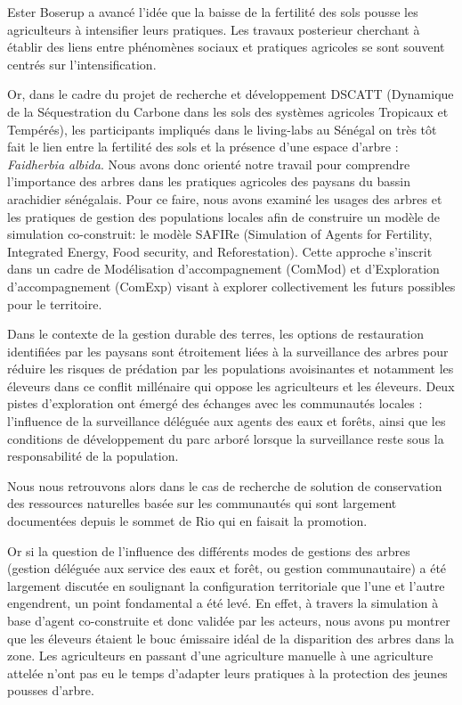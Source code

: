 \documentclass{article}
\begin{document}
Ester Boserup \parencite{boserup_conditions_1965} a avancé l'idée que la baisse de la fertilité des sols pousse les agriculteurs à intensifier leurs pratiques. Les travaux posterieur cherchant à établir des liens entre phénomènes sociaux et pratiques agricoles se sont souvent centrés sur l'intensification. 

Or, dans le cadre du projet de recherche et développement DSCATT (Dynamique de la Séquestration du Carbone dans les sols des systèmes agricoles Tropicaux et Tempérés), les participants impliqués dans le living-labs au Sénégal on très tôt fait le lien entre la fertilité des sols et la présence d'une espace d'arbre : \textit{Faidherbia albida}. Nous avons donc orienté notre travail pour comprendre l'importance des arbres dans les pratiques agricoles des paysans du bassin arachidier sénégalais. Pour ce faire, nous avons examiné les usages des arbres et les pratiques de gestion des populations locales afin de construire un modèle de simulation co-construit: le modèle SAFIRe (Simulation of Agents for Fertility, Integrated Energy, Food security, and Reforestation). Cette approche s'inscrit dans un cadre de Modélisation d'accompagnement (ComMod) \parencite{etienne_companion_2014,barreteau_our_2003} et d'Exploration d'accompagnement (ComExp) \parencite{delay_comexp_2020} visant à explorer collectivement les futurs possibles pour le territoire.

Dans le contexte de la gestion durable des terres, les options de restauration identifiées par les paysans sont étroitement liées à la surveillance des arbres pour réduire les risques de prédation par les populations avoisinantes et notamment les éleveurs dans ce conflit millénaire qui oppose les agriculteurs et les éleveurs. Deux pistes d'exploration ont émergé des échanges avec les communautés locales : l'influence de la surveillance déléguée aux agents des eaux et forêts, ainsi que les conditions de développement du parc arboré lorsque la surveillance reste sous la responsabilité de la population. 

Nous nous retrouvons alors dans le cas de recherche de solution de conservation des ressources naturelles basée sur les communautés qui sont largement documentées depuis le sommet de Rio qui en faisait la promotion\parencite{selfa_politics_2008, maraseni_assessment_2019, he_community_2020}.

Or si la question de l'influence des différents modes de gestions des arbres (gestion déléguée aux service des eaux et forêt, ou gestion communautaire) a été largement discutée en soulignant la configuration territoriale que l'une et l'autre engendrent, un point fondamental a été levé. En effet, à travers la simulation à base d'agent co-construite et donc validée par les acteurs, nous avons pu montrer que les éleveurs étaient le bouc émissaire idéal de la disparition des arbres dans la zone. Les agriculteurs en passant d'une agriculture manuelle à une agriculture attelée n'ont pas eu le temps d'adapter leurs pratiques à la protection des jeunes pousses d'arbre. 
\end{document}
